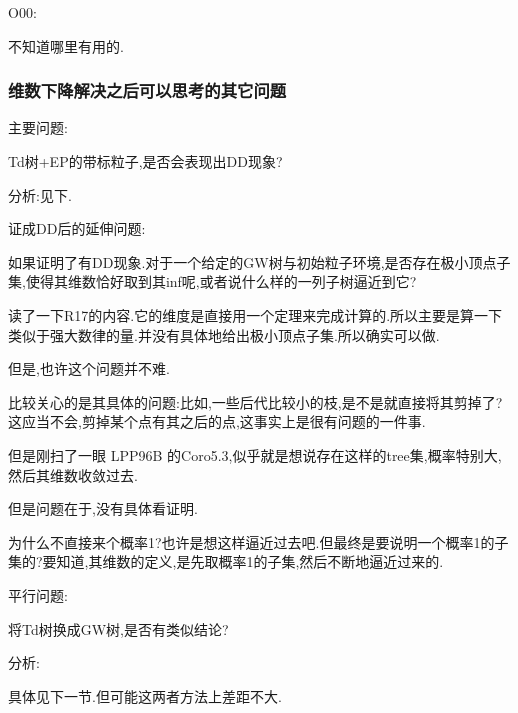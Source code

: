 				O00:

					不知道哪里有用的.
			
			\subsubsection*{维数下降解决之后可以思考的其它问题}

				主要问题:

					\begin{que}

						Td树+EP的带标粒子,是否会表现出DD现象?
					
					\end{que}

					分析:见下.					

				证成DD后的延伸问题:

					\begin{que}

						如果证明了有DD现象.对于一个给定的GW树与初始粒子环境,是否存在极小顶点子集,使得其维数恰好取到其inf呢,或者说什么样的一列子树逼近到它?
					
					\end{que}

						读了一下R17的内容.它的维度是直接用一个定理来完成计算的.所以主要是算一下类似于强大数律的量.并没有具体地给出极小顶点子集.所以确实可以做.

						但是,也许这个问题并不难.

						比较关心的是其具体的问题:比如,一些后代比较小的枝,是不是就直接将其剪掉了?这应当不会,剪掉某个点有其之后的点,这事实上是很有问题的一件事.

						但是刚扫了一眼 LPP96B 的Coro5.3,似乎就是想说存在这样的tree集,概率特别大,然后其维数收敛过去.

							但是问题在于,没有具体看证明.

							为什么不直接来个概率1?也许是想这样逼近过去吧.但最终是要说明一个概率1的子集的?要知道,其维数的定义,是先取概率1的子集,然后不断地逼近过来的.	

				平行问题:

					\begin{que}

						将Td树换成GW树,是否有类似结论?
					
					\end{que}

					分析:

						具体见下一节.但可能这两者方法上差距不大.

